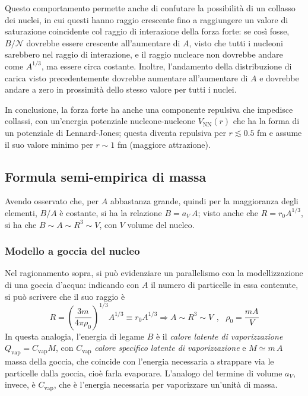 \documentclass[11pt, a4paper]{scrartcl}
\theoremstyle{style}
\numberwithin{equation}{subsection}
\begin{document}
Questo comportamento permette anche di confutare la possibilit\`a di un collasso dei nuclei, in cui questi hanno raggio crescente fino a raggiungere un valore di saturazione coincidente col raggio di interazione della forza forte: se cos\`i fosse, $B / \mathcal{N} $ dovrebbe essere crescente all'aumentare di $A$, visto che tutti i nucleoni sarebbero nel raggio di interazione, e il raggio nucleare non dovrebbe andare come $A ^{1 / 3}$, ma essere circa costante. 
	Inoltre, l'andamento della distribuzione di carica visto precedentemente dovrebbe aumentare all'aumentare di $A$ e dovrebbe andare a zero in prossimit\`a dello stesso valore per tutti i nuclei.

In conclusione, la forza forte ha anche una componente repulsiva che impedisce collassi, con un'energia potenziale nucleone-nucleone $V_{\text{NN}}(r)$ che ha la forma di un potenziale di Lennard-Jones; questa diventa repulsiva per $r\lesssim 0.5$ fm e assume il suo valore minimo per $r \sim 1$ fm (maggiore attrazione).

\subsection{Formula semi-empirica di massa}
Avendo osservato che, per $A$ abbastanza grande, quindi per la maggioranza degli elementi, $B / A$ \`e costante, si ha la relazione $B = a_V \, A$; visto anche che $R = r_0 A^{1 / 3}$, si ha che $B \sim A \sim R^3 \sim V$, con $V$ volume del nucleo.
\subsubsection{Modello a goccia del nucleo}
Nel ragionamento sopra, si pu\`o evidenziare un parallelismo con la modellizzazione di una goccia d'acqua: indicando con $A$ il numero di particelle in essa contenute, si pu\`o scrivere che il suo raggio \`e
\[
R = \left(\frac{3m }{ 4\pi \rho  _0}\right) ^{ 1/3 } A^{1 / 3 } \equiv r_0 A^{1 / 3} \Rightarrow A \sim R^3 \sim V\ \, , \ \ \  \rho _0 = \frac{mA }{V}
\] 
In questa analogia, l'energia di legame $B$ \`e il \textit{calore latente di vaporizzazione} $Q_\text{vap} = C_\text{vap} M$, con $C_\text{vap}$ \textit{calore specifico latente di vaporizzazione} e $M \simeq m \, A$ massa della goccia, che coincide con l'energia necessaria a strappare via le particelle dalla goccia, cio\`e farla evaporare. 
L'analogo del termine di volume $a_V$, invece, \`e $C_\text{vap}$, che \`e l'energia necessaria per vaporizzare un'unit\`a di massa.
\end{document}
